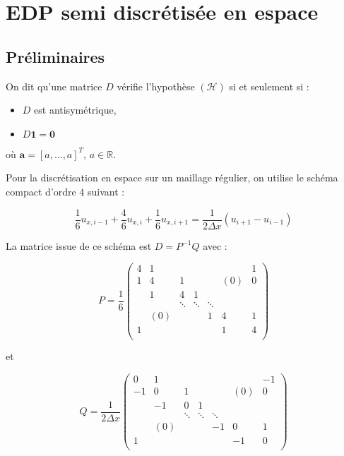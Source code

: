 \documentclass[10pt,a4paper]{article}
\begin{document}
\section{EDP semi discrétisée en espace}

\subsection{Préliminaires}

On dit qu'une matrice $D$ vérifie l'hypothèse $(\mathcal{H})$ si et seulement si :
\begin{itemize}
\item $D$ est antisymétrique,
\item $D \mathbf{1} = \mathbf{0}$
\end{itemize}

où $\mathbf{a} = \left[a, \ldots, a \right]^T$, $a \in \mathbb{R}$.

Pour la discrétisation en espace sur un maillage régulier, on utilise le schéma compact d'ordre $4$ suivant :

\begin{equation}
\dfrac{1}{6} u_{x,i-1} + \dfrac{4}{6} u_{x,i} + \dfrac{1}{6} u_{x,i+1} = \dfrac{1}{2\Delta x}\left( u_{i+1} - u_{i-1} \right)
\end{equation}

La matrice issue de ce schéma est $D=P^{-1}Q$ avec :

$$P=\dfrac{1}{6} 
\begin{pmatrix}
4 & 1 &   &   &   &   & 1 \\
1 & 4 & 1 &   &   &(0)& 0 \\
  & 1 & 4 & 1 &   &   &   \\
  &   & \ddots & \ddots & \ddots &  & \\
  &(0)&   &   & 1 & 4 & 1 \\
1 &   &   &   &   & 1 & 4 \\
\end{pmatrix}
$$

et

$$Q=\dfrac{1}{2\Delta x} 
\begin{pmatrix}
0 & 1 &   &   &   &   & -1 \\
-1 & 0 & 1 &   &   &(0)& 0 \\
  & -1 & 0 & 1 &   &   &   \\
  &   & \ddots & \ddots & \ddots &  & \\
  &(0)&   &   & -1 & 0 & 1 \\
1 &   &   &   &   & -1 & 0 \\
\end{pmatrix}
$$
\end{document}
